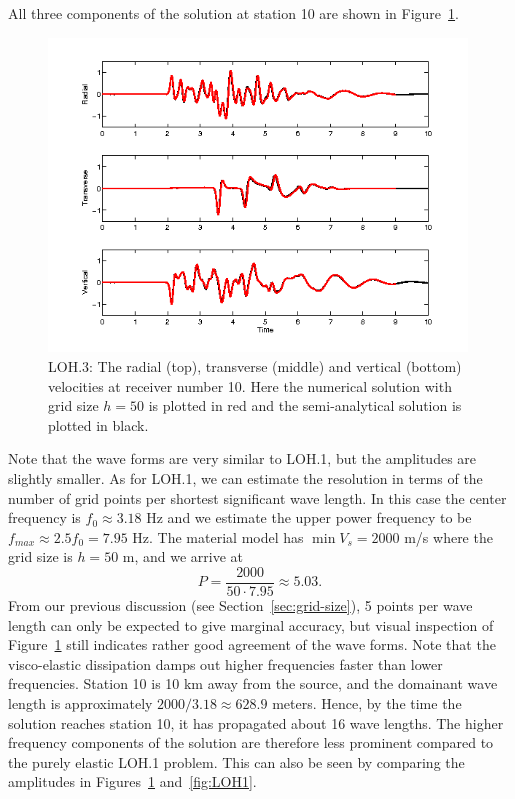 \documentclass[11pt]{report}
\begin{document}
All three components of the solution at station 10 are shown in Figure~\ref{fig:LOH3}.
\begin{figure}[ht]
  \begin{center}
    \includegraphics[width=0.99\textwidth]{figures/LOH3.png}
    \caption{LOH.3: The radial (top), transverse (middle) and vertical (bottom) velocities at
      receiver number 10. Here the numerical solution with grid size $h=50$ is plotted in red and
      the semi-analytical solution is plotted in black.}
    \label{fig:LOH3}
  \end{center}
\end{figure}
Note that the wave forms are very similar to LOH.1, but the amplitudes are slightly smaller.
As for LOH.1, we can estimate the resolution in terms of the number of grid points per shortest
significant wave length. In this case the center frequency is $f_0\approx 3.18$ Hz and we estimate
the upper power frequency to be $f_{max}\approx 2.5 f_0 = 7.95$ Hz. The material model has $\min V_s
= 2000$ m/s where the grid size is $h=50$ m, and we arrive at
\[
P = \dfrac{2000}{50\cdot 7.95} \approx 5.03.
\]
From our previous discussion (see Section~\ref{sec:grid-size}), 5 points per wave length can only be
expected to give marginal accuracy, but visual inspection of Figure~\ref{fig:LOH3} still indicates
rather good agreement of the wave forms. Note that the visco-elastic dissipation damps out higher
frequencies faster than lower frequencies. Station 10 is 10 km away from the source, and the
domainant wave length is approximately $2000/3.18 \approx 628.9$ meters. Hence, by the time the
solution reaches station 10, it has propagated about 16 wave lengths. The higher frequency
components of the solution are therefore less prominent compared to the purely elastic LOH.1
problem. This can also be seen by comparing the amplitudes in Figures~\ref{fig:LOH3}
and~\ref{fig:LOH1}.
\end{document}
